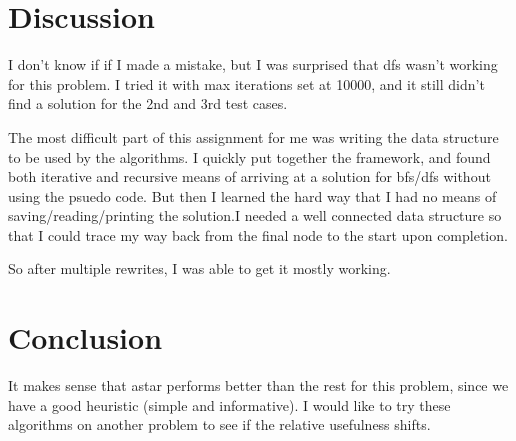 \documentclass[letterpaper,12pt,titlepage]{article}
\begin{document}
\section*{Discussion} 

I don't know if if I made a mistake, but I was surprised that dfs wasn't working for this problem. I tried it with max iterations set at 10000, and it still didn't find a solution for the 2nd and 3rd test cases.

The most difficult part of this assignment for me was writing the data structure to be used by the algorithms. I quickly put together the framework, and found both iterative and recursive means of arriving at a solution for bfs/dfs without using the psuedo code. But then I learned the hard way that I had no means of saving/reading/printing the solution.I needed a well connected data structure so that I could trace my way back from the final node to the start upon completion.

So after multiple rewrites, I was able to get it mostly working.

\section*{Conclusion} 

It makes sense that astar performs better than the rest for this problem, since we have a good heuristic (simple and informative). I would like to try these algorithms on another problem to see if the relative usefulness shifts. 
\end{document}
